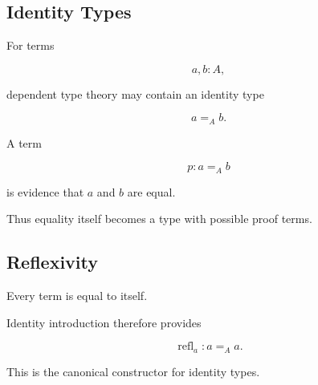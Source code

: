 
\subsection{Identity Types}
\label{subsec:identity-types}

For terms

\[
a,b:A,
\]

dependent type theory may contain an identity type

\[
\boxed{
a=_A b.
}
\]

A term

\[
p:a=_A b
\]

is evidence that \(a\) and \(b\) are equal.

Thus equality itself becomes a type with possible proof terms.

\subsection{Reflexivity}
\label{subsec:identity-reflexivity}

Every term is equal to itself.

Identity introduction therefore provides

\[
\boxed{
\operatorname{refl}_a
:
a=_A a.
}
\]

This is the canonical constructor for identity types.

